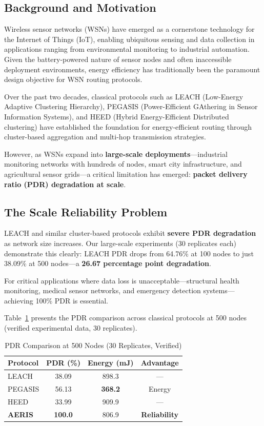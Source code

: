 \documentclass[twocolumn]{article}
\begin{document}
\subsection{Background and Motivation}

Wireless sensor networks (WSNs) have emerged as a cornerstone technology for
the Internet of Things (IoT), enabling ubiquitous sensing and data collection
in applications ranging from environmental monitoring to industrial automation.
Given the battery-powered nature of sensor nodes and often inaccessible
deployment environments, energy efficiency has traditionally been the paramount
design objective for WSN routing protocols.

Over the past two decades, classical protocols such as LEACH (Low-Energy
Adaptive Clustering Hierarchy), PEGASIS (Power-Efficient GAthering in Sensor
Information Systems), and HEED (Hybrid Energy-Efficient Distributed clustering)
have established the foundation for energy-efficient routing through
cluster-based aggregation and multi-hop transmission strategies.

However, as WSNs expand into \textbf{large-scale deployments}---industrial
monitoring networks with hundreds of nodes, smart city infrastructure, and
agricultural sensor grids---a critical limitation has emerged:
\textbf{packet delivery ratio (PDR) degradation at scale}.

\subsection{The Scale Reliability Problem}

LEACH and similar cluster-based protocols exhibit \textbf{severe PDR degradation}
as network size increases. Our large-scale experiments (30 replicates each)
demonstrate this clearly: LEACH PDR drops from 64.76\% at 100 nodes to just
38.09\% at 500 nodes---a \textbf{26.67 percentage point degradation}.

For critical applications where data loss is unacceptable---structural health
monitoring, medical sensor networks, and emergency detection systems---achieving
100\% PDR is essential.

Table~\ref{tab:pdr_comparison} presents the PDR comparison across classical
protocols at 500 nodes (verified experimental data, 30 replicates).

\begin{table}[htbp]
\centering
\caption{PDR Comparison at 500 Nodes (30 Replicates, Verified)}
\label{tab:pdr_comparison}
\begin{tabular}{@{}lccc@{}}
\toprule
Protocol & PDR (\%) & Energy (mJ) & Advantage \\
\midrule
LEACH & 38.09 & 898.3 & --- \\
PEGASIS & 56.13 & \textbf{368.2} & Energy \\
HEED & 33.99 & 909.9 & --- \\
\textbf{AERIS} & \textbf{100.0} & 806.9 & \textbf{Reliability} \\
\bottomrule
\end{tabular}
\end{table}
\end{document}
